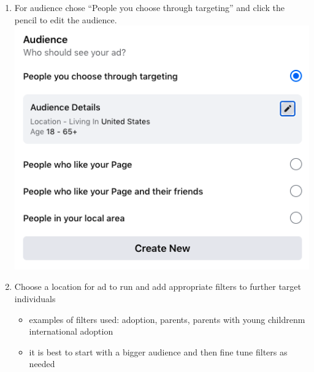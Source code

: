 \documentclass[]{book}
\begin{document}
\begin{enumerate}
\def\labelenumi{\arabic{enumi}.}
\setcounter{enumi}{6}
\item
  For audience chose ``People you choose through targeting'' and click the pencil to edit the audience.
  \includegraphics{images/lab_protocols/fb_ads/7.png}
\item
  Choose a location for ad to run and add appropriate filters to further target individuals

  \begin{itemize}
  \item
    examples of filters used: adoption, parents, parents with young childrenm international adoption
  \item
    it is best to start with a bigger audience and then fine tune filters as needed
  \end{itemize}
\end{enumerate}
\end{document}
